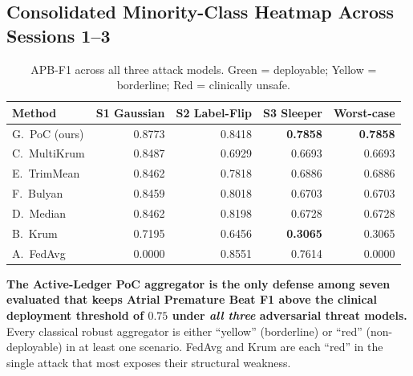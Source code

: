 \documentclass[11pt,a4paper]{article}
\begin{document}
\subsection{Consolidated Minority-Class Heatmap Across Sessions 1--3}

\begin{table}[H]
\centering
\caption{APB-F1 across all three attack models. \colorbox{softgreen}{Green} = deployable; \colorbox{softyellow}{Yellow} = borderline; \colorbox{softred}{Red} = clinically unsafe.}
\label{tab:apb_heatmap}
\begin{tabular}{@{}l rrr r@{}}
\toprule
\textbf{Method} & \textbf{S1 Gaussian} & \textbf{S2 Label-Flip} & \textbf{S3 Sleeper} & \textbf{Worst-case} \\
\midrule
G.\ PoC (ours) & \cellcolor{softgreen}0.8773 & \cellcolor{softgreen}0.8418 & \cellcolor{softgreen}\textbf{0.7858} & \cellcolor{softgreen}\textbf{0.7858} \\
C.\ MultiKrum  & \cellcolor{softgreen}0.8487 & \cellcolor{softyellow}0.6929 & \cellcolor{softyellow}0.6693 & \cellcolor{softyellow}0.6693 \\
E.\ TrimMean   & \cellcolor{softgreen}0.8462 & \cellcolor{softgreen}0.7818 & \cellcolor{softyellow}0.6886 & \cellcolor{softyellow}0.6886 \\
F.\ Bulyan     & \cellcolor{softgreen}0.8459 & \cellcolor{softgreen}0.8018 & \cellcolor{softyellow}0.6703 & \cellcolor{softyellow}0.6703 \\
D.\ Median     & \cellcolor{softgreen}0.8462 & \cellcolor{softgreen}0.8198 & \cellcolor{softyellow}0.6728 & \cellcolor{softyellow}0.6728 \\
B.\ Krum       & \cellcolor{softyellow}0.7195 & \cellcolor{softyellow}0.6456 & \cellcolor{softred}\textbf{0.3065} & \cellcolor{softred}0.3065 \\
A.\ FedAvg     & \cellcolor{softred}0.0000 & \cellcolor{softgreen}0.8551 & \cellcolor{softgreen}0.7614 & \cellcolor{softred}0.0000 \\
\bottomrule
\end{tabular}
\end{table}

\begin{claimbox}
\textbf{The Active-Ledger PoC aggregator is the only defense among seven
evaluated that keeps Atrial Premature Beat F1 above the clinical
deployment threshold of $0.75$ under \emph{all three} adversarial threat
models.} Every classical robust aggregator is either ``yellow'' (borderline)
or ``red'' (non-deployable) in at least one scenario. FedAvg and Krum
are each ``red'' in the single attack that most exposes their structural
weakness.
\end{claimbox}
\end{document}
